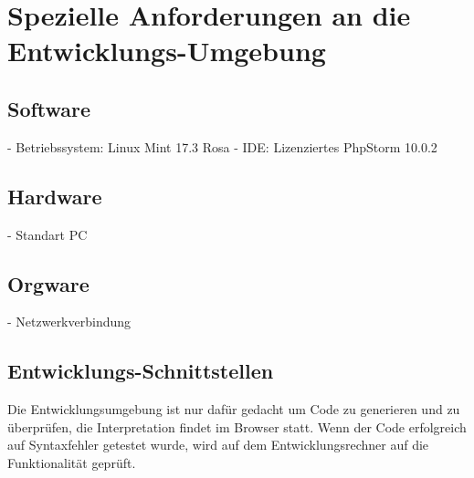 \section{Spezielle Anforderungen an die Entwicklungs-Umgebung}

    \subsection{Software}

    - Betriebssystem: Linux Mint 17.3 Rosa
    - IDE: Lizenziertes PhpStorm 10.0.2

    \subsection{Hardware}
    - Standart PC

    \subsection{Orgware}
    - Netzwerkverbindung

    \subsection{Entwicklungs-Schnittstellen}
    Die Entwicklungsumgebung ist nur dafür gedacht um Code zu generieren und zu überprüfen,
    die Interpretation findet im Browser statt. Wenn der Code erfolgreich auf Syntaxfehler
    getestet wurde, wird auf dem Entwicklungsrechner auf die Funktionalität geprüft.